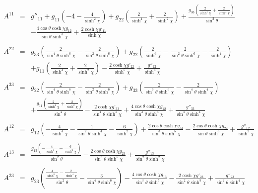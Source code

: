 \documentclass[10pt,letterpaper]{article}
\numberwithin{equation}{section}
\begin{document}
\begin{eqnarray}
A^{11}&=& g''_{11} + g_{11} \left(-4 -  \frac{4}{\sinh^2\chi}\right) + g_{22} \left(\frac{2}{\sinh^4\chi} + \frac{2}{\sinh^2\chi}\right) + \frac{g_{33} \left(\frac{2}{\sinh^4\chi} + \frac{2}{\sinh^2\chi}\right)}{\sin^2\theta} \nonumber \\ 
&& -  \frac{4 \cos\theta \cosh\chi g_{12}}{\sin\theta \sinh^3\chi} + \frac{2 \cosh\chi g'_{11}}{\sinh\chi}
\\  \nonumber\\ 
A^{22}&=& g_{33} \left(\frac{2}{\sin^4\theta \sinh^6\chi} -  \frac{2}{\sin^2\theta \sinh^6\chi}\right) + g_{22} \left(\frac{2}{\sinh^6\chi} -  \frac{2}{\sin^2\theta \sinh^6\chi} -  \frac{2}{\sinh^4\chi}\right) \nonumber \\ 
&& + g_{11} \left(\frac{2}{\sinh^4\chi} + \frac{2}{\sinh^2\chi}\right) -  \frac{2 \cosh\chi g'_{22}}{\sinh^5\chi} + \frac{g''_{22}}{\sinh^4\chi}
\\  \nonumber\\ 
A^{33}&=& g_{22} \left(\frac{2}{\sin^4\theta \sinh^6\chi} -  \frac{2}{\sin^2\theta \sinh^6\chi}\right) + g_{33} \left(\frac{2}{\sin^6\theta \sinh^6\chi} -  \frac{2}{\sin^4\theta \sinh^4\chi}\right) \nonumber \\ 
&& + \frac{g_{11} \left(\frac{2}{\sinh^4\chi} + \frac{2}{\sinh^2\chi}\right)}{\sin^2\theta} -  \frac{2 \cosh\chi g'_{33}}{\sin^4\theta \sinh^5\chi} + \frac{4 \cos\theta \cosh\chi g_{12}}{\sin^3\theta \sinh^5\chi} + \frac{g''_{33}}{\sin^4\theta \sinh^4\chi}
\\  \nonumber\\ 
A^{12}&=& g_{12} \left(- \frac{4}{\sinh^4\chi} -  \frac{1}{\sin^2\theta \sinh^4\chi} -  \frac{6}{\sinh^2\chi}\right) + \frac{2 \cos\theta \cosh\chi g_{33}}{\sin^3\theta \sinh^5\chi} -  \frac{2 \cos\theta \cosh\chi g_{22}}{\sin\theta \sinh^5\chi} + \frac{g''_{12}}{\sinh^2\chi}
\\  \nonumber\\ 
A^{13}&=& \frac{g_{13} \left(- \frac{4}{\sinh^4\chi} -  \frac{6}{\sinh^2\chi}\right)}{\sin^2\theta} -  \frac{2 \cos\theta \cosh\chi g_{23}}{\sin^3\theta \sinh^5\chi} + \frac{g''_{13}}{\sin^2\theta \sinh^2\chi}
\\  \nonumber\\ 
A^{23}&=& g_{23} \left(\frac{\frac{4}{\sinh^6\chi} -  \frac{2}{\sinh^4\chi}}{\sin^2\theta} -  \frac{3}{\sin^4\theta \sinh^6\chi}\right) -  \frac{4 \cos\theta \cosh\chi g_{13}}{\sin^3\theta \sinh^5\chi} -  \frac{2 \cosh\chi g'_{23}}{\sin^2\theta \sinh^5\chi} + \frac{g''_{23}}{\sin^2\theta \sinh^4\chi}
\end{eqnarray}
\end{document}
